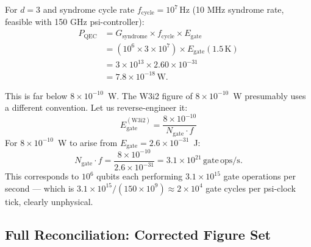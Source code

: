 \documentclass[11pt]{article}
\theoremstyle{definition}
\theoremstyle{remark}
\begin{document}
For $d = 3$ and syndrome cycle rate $f_{\mathrm{cycle}} = 10^7\,\mathrm{Hz}$
(10 MHz syndrome rate, feasible with 150 GHz psi-controller):
\begin{align}
P_{\mathrm{QEC}} &= G_{\mathrm{syndrome}}\times f_{\mathrm{cycle}}
\times E_{\mathrm{gate}} \nonumber\\
&= (10^6\times 3\times 10^7)\times E_{\mathrm{gate}}(1.5\,\mathrm{K}) \nonumber\\
&= 3\times10^{13}\times 2.60\times10^{-31} \nonumber\\
&= 7.8\times10^{-18}\,\mathrm{W}.
\label{eq:pqec_low}
\end{align}

This is far below $8\times10^{-10}$~W. The W3i2 figure of $8\times10^{-10}$~W
presumably uses a different convention. Let us reverse-engineer it:
\begin{equation}
E_{\mathrm{gate}}^{(\mathrm{W3i2})} = \frac{8\times10^{-10}}{N_{\mathrm{gate}} \cdot f}
\label{eq:reverse_engineer}
\end{equation}
For $8\times10^{-10}$~W to arise from $E_{\mathrm{gate}} = 2.6\times10^{-31}$~J:
\begin{equation}
N_{\mathrm{gate}} \cdot f = \frac{8\times10^{-10}}{2.6\times10^{-31}}
= 3.1\times10^{21}\,\mathrm{gate\,ops/s}.
\label{eq:gate_rate_needed}
\end{equation}
This corresponds to $10^6$ qubits each performing $3.1\times10^{15}$
gate operations per second --- which is $3.1\times10^{15}/(150\times10^9) \approx
2\times10^4$ gate cycles per psi-clock tick, clearly unphysical.

\subsection{Full Reconciliation: Corrected Figure Set}
\label{sec:reconciliation}
\end{document}

